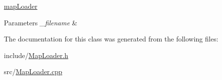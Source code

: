 \hyperlink{classmapLoader}{map\-Loader} 


\begin{DoxyParams}{Parameters}
{\em \-\_\-filename} & \\
\hline
\end{DoxyParams}


The documentation for this class was generated from the following files\-:\begin{DoxyCompactItemize}
\item 
include/\hyperlink{MapLoader_8h}{Map\-Loader.\-h}\item 
src/\hyperlink{MapLoader_8cpp}{Map\-Loader.\-cpp}\end{DoxyCompactItemize}
